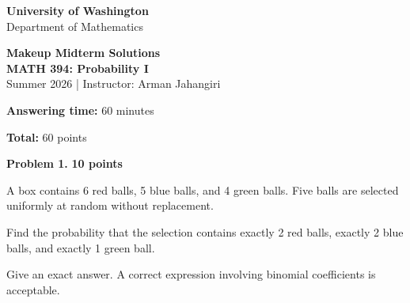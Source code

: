 \documentclass[11pt]{article}
\newcommand{\course}{MATH 394: Probability I}
\newcommand{\instructor}{Arman Jahangiri}
\newcommand{\department}{Department of Mathematics}
\newcommand{\university}{University of Washington}
\begin{document}

\begin{titlepage}
\centering
\vspace*{1.2cm}

{\Large \textbf{\university}}\\
{\large \department}

\vspace{1.4cm}

{\Huge \color{uwpurple}\textbf{Makeup Midterm  Solutions}}\\[0.25cm]
{\Large \textbf{\course}}\\[0.25cm]
{\large Summer 2026 \quad | \quad Instructor: \instructor}

\vspace{1cm}

\begin{tcolorbox}[
    width=0.78\textwidth,
    colback=softpurple,
    colframe=uwpurple,
    boxrule=0.9pt,
    arc=3mm
]
\centering

\textbf{Answering time:} 60 minutes

\textbf{Total:} 60 points

\end{tcolorbox}

\end{titlepage}



\begin{problemheader}
\textbf{Problem 1.} \hfill \textbf{10 points}
\end{problemheader}

A box contains 6 red balls, 5 blue balls, and 4 green balls. Five balls
are selected uniformly at random without replacement.

Find the probability that the selection contains exactly 2 red balls,
exactly 2 blue balls, and exactly 1 green ball.

Give an exact answer. A correct expression involving binomial coefficients
is acceptable.
\end{document}
